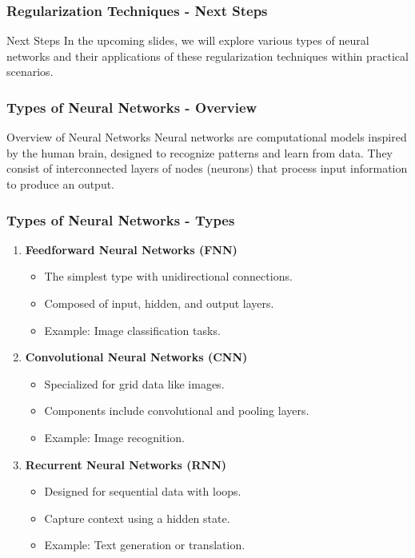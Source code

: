 \documentclass[aspectratio=169]{beamer}
\begin{document}
\begin{frame}[fragile]
    \frametitle{Regularization Techniques - Next Steps}
    \begin{block}{Next Steps}
        In the upcoming slides, we will explore various types of neural networks and their applications of these regularization techniques within practical scenarios.
    \end{block}
\end{frame}

\begin{frame}[fragile]
    \frametitle{Types of Neural Networks - Overview}
    \begin{block}{Overview of Neural Networks}
        Neural networks are computational models inspired by the human brain, designed to recognize patterns and learn from data. They consist of interconnected layers of nodes (neurons) that process input information to produce an output.
    \end{block}
\end{frame}

\begin{frame}[fragile]
    \frametitle{Types of Neural Networks - Types}
    \begin{enumerate}
        \item \textbf{Feedforward Neural Networks (FNN)}
            \begin{itemize}
                \item The simplest type with unidirectional connections.
                \item Composed of input, hidden, and output layers.
                \item Example: Image classification tasks.
            \end{itemize}
        
        \item \textbf{Convolutional Neural Networks (CNN)}
            \begin{itemize}
                \item Specialized for grid data like images.
                \item Components include convolutional and pooling layers.
                \item Example: Image recognition.
            \end{itemize}
        
        \item \textbf{Recurrent Neural Networks (RNN)}
            \begin{itemize}
                \item Designed for sequential data with loops.
                \item Capture context using a hidden state.
                \item Example: Text generation or translation.
            \end{itemize}
    \end{enumerate}
\end{frame}
\end{document}
